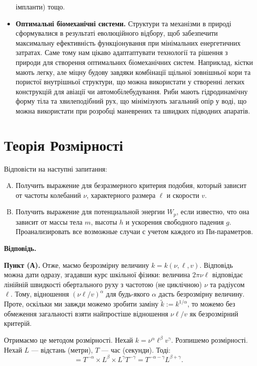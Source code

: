 \documentclass{hw_template}
\begin{document}
\begin{itemize}
    імпланти) тощо.
    \item \textbf{Оптимальні біомеханічні системи.} Структури та механізми в
    природі сформувалися в результаті еволюційного відбору, щоб забезпечити
    максимальну ефективність функціонування при мінімальних енергетичних
    затратах. Саме тому нам цікаво адаптаптувати технології та рішення з природи
    для створення оптимальних біомеханічних систем. Наприклад, кістки мають
    легку, але міцну будову завдяки комбінації щільної зовнішньої кори та
    пористої внутрішньої структури, що можна використати у створенні легких
    конструкцій для авіації чи автомобілебудування. Риби мають гідродинамічну
    форму тіла та хвилеподібний рух, що мінімізують загальний опір у воді, що
    можна використати при розробці маневрених та швидких підводних апаратів. 
\end{itemize}

\section{Теорія Розмірності}

\begin{problems}
    Відповісти на наступні запитання:
    \begin{enumerate}[(A)]
        \item Получить выражение для безразмерного критерия подобия, который зависит от частоты колебаний $\nu$, характерного размера $\ell$ и скорости $v$.
        \item Получить выражение для потенциальной энергии $W_p$, если известно, что она зависит от массы тела $m$, высоты $h$ и ускорения свободного падения $g$. Проанализировать все возможные случаи с учетом каждого из Пи-параметров.
    \end{enumerate}
\end{problems}

\textbf{Відповідь.}

\textbf{Пункт (А).} Отже, маємо безрозмірну величину $k = k(\nu,\ell,v)$.
Відповідь можна дати одразу, згадавши курс шкільної фізики: величина $2\pi\nu
\ell$ відповідає лінійній швидкості обертального руху з частотою (не циклічною)
$\nu$ та радіусом $\ell$. Тому, відношення $(\nu \ell/v)^{\alpha}$ для
будь-якого $\alpha$ дасть безрозмірну величину. Проте, оскільки ми завжди можемо
зробити заміну $\widetilde{k} := k^{1/\alpha}$, то можемо без обмеження
загальності взяти найпростіше відношення $\nu \ell/v$ як безрозмірний критерій.

Отримаємо це методом розмірності. Нехай $k=\nu^{\alpha}\ell^{\beta}v^{\gamma}$.
Розпишемо розмірності. Нехай $L$ --- відстань (метри), $T$ --- час (секунди).
Тоді:
\begin{equation*}
    [k] = T^{-\alpha} \times L^{\beta} \times L^{\gamma}T^{-\gamma} = T^{-\alpha-\gamma}L^{\beta+\gamma}.
\end{equation*}
\end{document}
